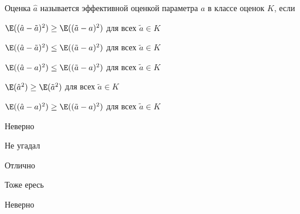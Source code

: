 
\begin{question}
Оценка \(\hat a\) называется эффективной оценкой параметра \(a\) в
классе оценок \(K\), если
\begin{answerlist}
  \item \(\E((\hat a - \tilde a)^2) \geq \E((\tilde a - a)^2)\) для всех
\(\tilde a \in K\)
  \item \(\E((\hat a - \tilde a)^2) \leq \E((\tilde a - a)^2)\) для всех
\(\tilde a \in K\)
  \item \(\E((\hat a - a)^2) \leq \E((\tilde a - a)^2)\) для всех
\(\tilde a \in K\)
  \item \(\E(\hat a^2) \geq \E(\tilde a ^2)\) для всех \(\tilde a \in K\)
  \item \(\E((\hat a - a)^2) \geq \E((\tilde a - a)^2)\) для всех
\(\tilde a \in K\)
\end{answerlist}
\end{question}

\begin{solution}
\begin{answerlist}
  \item Неверно
  \item Не угадал
  \item Отлично
  \item Тоже ересь
  \item Неверно
\end{answerlist}
\end{solution}


